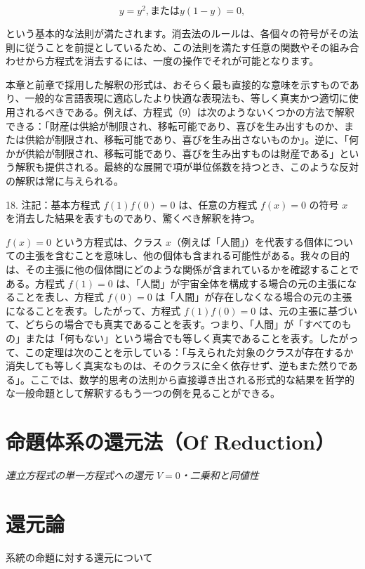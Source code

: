 \documentclass[a4paper,11pt,openany]{ltjsbook}
\begin{document}
\[
y = y^2, \text{または} y(1-y) = 0,
\]

という基本的な法則が満たされます。消去法のルールは、各個々の符号がその法則に従うことを前提としているため、この法則を満たす任意の関数やその組み合わせから方程式を消去するには、一度の操作でそれが可能となります。

本章と前章で採用した解釈の形式は、おそらく最も直接的な意味を示すものであり、一般的な言語表現に適応したより快適な表現法も、等しく真実かつ適切に使用されるべきである。例えば、方程式（9）は次のようないくつかの方法で解釈できる：「財産は供給が制限され、移転可能であり、喜びを生み出すものか、または供給が制限され、移転可能であり、喜びを生み出さないものか」。逆に、「何かが供給が制限され、移転可能であり、喜びを生み出すものは財産である」という解釈も提供される。最終的な展開で項が単位係数を持つとき、このような反対の解釈は常に与えられる。

18. 注記：基本方程式 $f(1)f(0) = 0$ は、任意の方程式 $f(x) = 0$ の符号 $x$ を消去した結果を表すものであり、驚くべき解釈を持つ。

$f(x) = 0$ という方程式は、クラス $x$（例えば「人間」）を代表する個体についての主張を含むことを意味し、他の個体も含まれる可能性がある。我々の目的は、その主張に他の個体間にどのような関係が含まれているかを確認することである。方程式 $f(1) = 0$ は、「人間」が宇宙全体を構成する場合の元の主張になることを表し、方程式 $f(0) = 0$ は「人間」が存在しなくなる場合の元の主張になることを表す。したがって、方程式 $f(1)f(0) = 0$ は、元の主張に基づいて、どちらの場合でも真実であることを表す。つまり、「人間」が「すべてのもの」または「何もない」という場合でも等しく真実であることを表す。したがって、この定理は次のことを示している：「与えられた対象のクラスが存在するか消失しても等しく真実なものは、そのクラスに全く依存せず、逆もまた然りである」。ここでは、数学的思考の法則から直接導き出される形式的な結果を哲学的な一般命題として解釈するもう一つの例を見ることができる。

\newpage

\chapter{命題体系の還元法（Of Reduction）}
\label{ch:viii}

\begin{center}
\large\textit{連立方程式の単一方程式への還元 $V = 0$・二乗和と同値性}
\end{center}
\vspace{4mm}

\chapter{還元論}
{\large 系統の命題に対する還元について}
\end{document}
